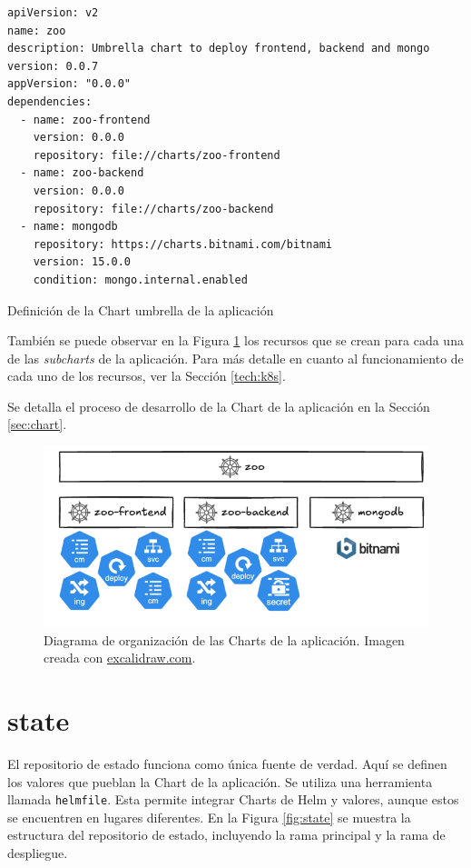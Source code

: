 \begin{listing}[!ht]
  \begin{verbatim}
apiVersion: v2
name: zoo
description: Umbrella chart to deploy frontend, backend and mongo
version: 0.0.7
appVersion: "0.0.0"
dependencies:
  - name: zoo-frontend
    version: 0.0.0
    repository: file://charts/zoo-frontend
  - name: zoo-backend
    version: 0.0.0
    repository: file://charts/zoo-backend
  - name: mongodb
    repository: https://charts.bitnami.com/bitnami
    version: 15.0.0
    condition: mongo.internal.enabled
  \end{verbatim}
  \caption{Definición de la Chart umbrella de la aplicación}
  \label{lst:umbrella}
\end{listing}

También se puede observar en la Figura \ref{fig:helm-repository} los recursos que se crean para cada una de las \textit{subcharts} de la aplicación. Para más detalle en cuanto al funcionamiento de cada uno de los recursos, ver la Sección \ref{tech:k8s}.

Se detalla el proceso de desarrollo de la Chart de la aplicación en la Sección \ref{sec:chart}.

\begin{figure}
  \centerline{\includegraphics[width=13cm]{figuras/helm-repository}}
  \caption{Diagrama de organización de las Charts de la aplicación. Imagen creada con \href{https://excalidraw.com}{excalidraw.com}.}
  \label{fig:helm-repository}
\end{figure}

\section{state}
\label{subsec:state}

El repositorio de estado funciona como única fuente de verdad. Aquí se definen  los valores que pueblan la Chart de la aplicación. Se utiliza una herramienta llamada \texttt{helmfile}\cite{helmfile}. Esta permite integrar Charts de Helm y valores, aunque estos se encuentren en lugares diferentes. En la Figura \ref{fig:state} se muestra la estructura del repositorio de estado, incluyendo la rama principal y la rama de despliegue.

